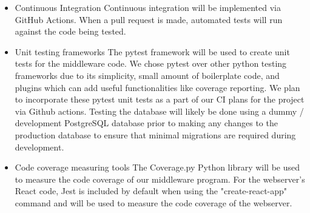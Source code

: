 \documentclass{article}
\begin{document}
\begin{itemize}

\item Continuous Integration
\subitem Continuous integration will be implemented via GitHub Actions. When a pull request is made, automated
tests will run against the code being tested.
\item Unit testing frameworks
\subitem The pytest framework will be used to create unit tests for the middleware
code. We chose pytest over other python testing frameworks due to its simplicity, 
small amount of boilerplate code, and plugins which can add useful functionalities
like coverage reporting. We plan to incorporate these pytest unit tests as a part
of our CI plans for the project via Github actions.
\subitem Testing the database will likely be done using a dummy / development 
PostgreSQL database prior to making any changes to the production database to 
ensure that minimal migrations are required during development.
\item Code coverage measuring tools
\subitem The Coverage.py Python library will be used to measure the code coverage
of our middleware program. For the webserver's React code, Jest is included by 
default when using the "create-react-app" command and will be used to measure 
the code coverage of the webserver.

\end{itemize}
\end{document}
